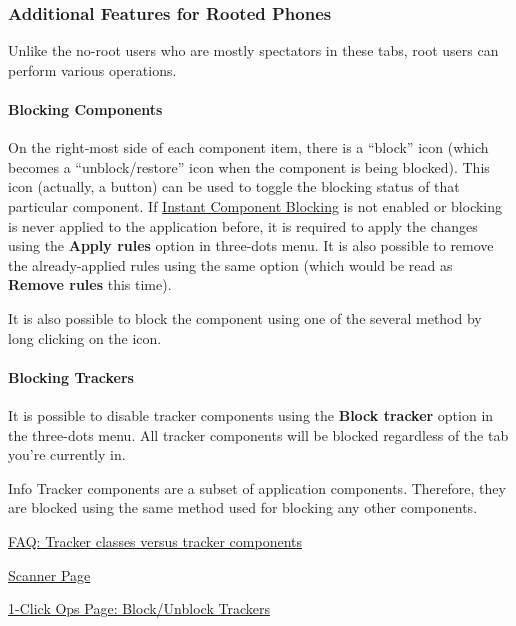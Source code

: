 \subsubsection{Additional Features for Rooted Phones} %
Unlike the no-root users who are mostly spectators in these tabs, root users can perform various operations.

\paragraph{Blocking Components} %
On the right-most side of each component item, there is a ``block'' icon (which becomes a ``unblock/restore'' icon when
the component is being blocked). This icon (actually, a button) can be used to toggle the blocking status of that
particular component. If \hyperref[subsubsec:instant-component-blocking]{Instant Component Blocking} is not enabled or
blocking is never applied to the application before, it is required to apply the changes using the \textbf{Apply rules}
option in three-dots menu. It is also possible to remove the already-applied rules using the same option (which would be
read as \textbf{Remove rules} this time).

It is also possible to block the component using one of the several method by long clicking on the icon.


\paragraph{Blocking Trackers}\label{par:appdetails:blocking-trackers} %
It is possible to disable tracker components using the \textbf{Block tracker} option in the three-dots menu. All tracker
components will be blocked regardless of the tab you're currently in.

\begin{tip}{Info}
    Tracker components are a subset of application components. Therefore, they are blocked using the same method used
    for blocking any other components.
\end{tip}

\begin{amseealso}
    \item \hyperref[subsec:tracker-classes-versus-tracker-components]{FAQ: Tracker classes versus tracker components}
    \item \hyperref[sec:scanner-page]{Scanner Page}
    \item \hyperref[subsec:block-unblock-trackers]{1-Click Ops Page: Block/Unblock Trackers}
\end{amseealso}

